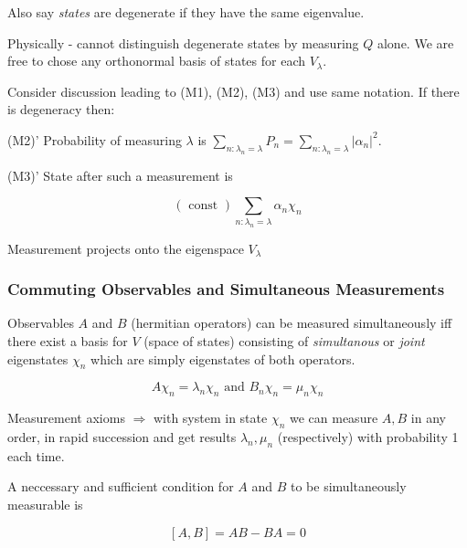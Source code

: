 \documentclass[a4paper]{article}
\begin{document}
Also say \emph{states} are degenerate if they have the same eigenvalue. 

Physically - cannot distinguish degenerate states by measuring $ Q $ alone. We are free to chose any orthonormal basis of states for each $ V_{\lambda} $.

Consider discussion leading to (M1), (M2), (M3) and use same notation. If there is degeneracy then:

(M2)' Probability of measuring $ \lambda $ is $ \sum_{n : \lambda_{n} = \lambda} P_{n} = \sum_{n: \lambda_{n} = \lambda}  | \alpha_{n} |^{2}  $.

(M3)' State after such a measurement is

\[ ( \text{ const }) \sum_{n : \lambda_{n}  =\lambda } \alpha_{n} \chi_{n} \]

Measurement projects onto the eigenspace $ V_{\lambda} $

\subsubsection{Commuting Observables and Simultaneous Measurements}

Observables $ A $ and $ B $ (hermitian operators) can be measured simultaneously iff there exist a basis for $ V $ (space of states) consisting of \emph{simultanous} or \emph{joint} eigenstates $ \chi_{n} $ which are simply eigenstates of both operators. 

\[ A \chi_{n} = \lambda_{n} \chi_{n} \text{ and } B_{n} \chi_{n} = \mu_{n} \chi_{n} \]

Measurement axioms $ \Rightarrow $ with system in state $ \chi_{n} $ we can measure $ A,B $ in any order, in rapid succession and get results $ \lambda_{n},\mu_{n} $ (respectively) with probability 1 each time. 

A neccessary and sufficient condition for $ A $ and $ B $ to be simultaneously measurable is 

\[ [  A,B] = AB - BA = 0 \]
\end{document}
